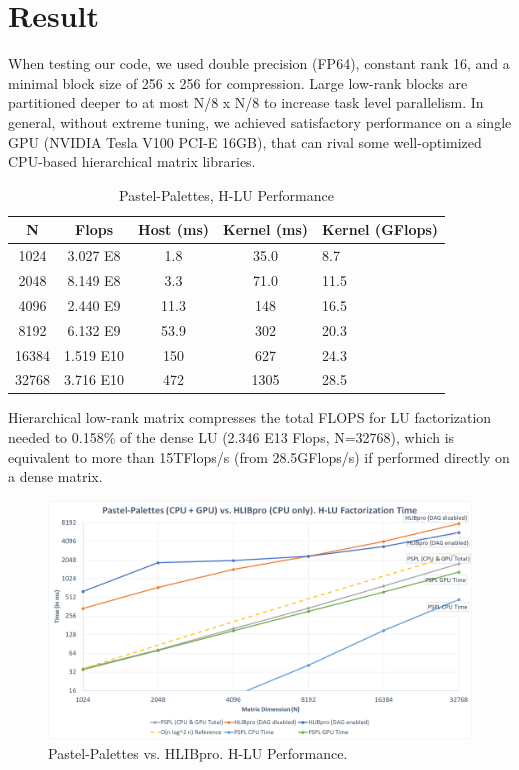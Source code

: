 \documentclass[sigconf]{acmart}
\begin{document}
\section{Result}
When testing our code, we used double precision (FP64), constant rank 16, and a minimal block size of 256 x 256 for compression. Large low-rank blocks are partitioned deeper to at most N/8 x N/8 to increase task level parallelism. In general, without extreme tuning, we achieved satisfactory performance on a single GPU (NVIDIA Tesla V100 PCI-E 16GB), that can rival some well-optimized CPU-based hierarchical matrix libraries.

\begin{table}[ht]
  \caption{Pastel-Palettes, H-LU Performance}
  \begin{tabular}{ccccl}
    \toprule
    N & Flops & Host (ms) & Kernel (ms) & Kernel (GFlops)\\
    \midrule
    1024 & 3.027 E8 & 1.8 & 35.0 & 8.7\\
    2048 & 8.149 E8 & 3.3 & 71.0 & 11.5\\
    4096 & 2.440 E9 & 11.3 & 148 & 16.5\\
    8192 & 6.132 E9 & 53.9 & 302 & 20.3\\
    16384 & 1.519 E10 & 150 & 627 & 24.3\\
    32768 & 3.716 E10 & 472 & 1305 & 28.5\\
  \bottomrule
\end{tabular}
\end{table}

Hierarchical low-rank matrix compresses the total FLOPS for LU factorization needed to 0.158\% of the dense LU (2.346 E13 Flops, N=32768), which is equivalent to more than 15TFlops/s (from 28.5GFlops/s) if performed directly on a dense matrix.

\begin{figure}[ht]
  \centering
  \includegraphics[width=\linewidth]{kernel_time}
  \caption{Pastel-Palettes vs. HLIBpro. H-LU Performance.}
\end{figure}
\end{document}
